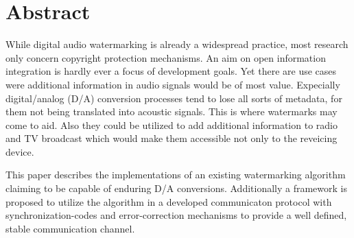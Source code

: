 \chapter*{Abstract}

While digital audio watermarking is already a widespread practice, most research only concern copyright protection mechanisms. An aim on open information integration is hardly ever a focus of development goals. Yet there are use cases were additional information in audio signals would be of most value. Expecially digital/analog (D/A) conversion processes tend to lose all sorts of metadata, for them not being translated into acoustic signals.
This is where watermarks may come to aid. Also they could be utilized to add additional information to radio and TV broadcast which would make them accessible not only to the reveicing device.

This paper describes the implementations of an existing watermarking algorithm claiming to be capable of enduring D/A conversions. Additionally a framework is proposed to utilize the algorithm in a developed communicaton protocol with synchronization-codes and error-correction mechanisms to provide a well defined, stable communication channel.

